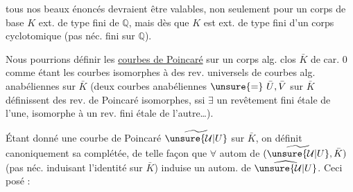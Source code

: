 tous nos beaux énoncés devraient être valables, non seulement pour un corps de base $K$ ext. de type fini de $\mathbb{Q}$, mais dès que $K$ est ext. de type fini d'un corps cyclotomique (pas néc. fini sur $\mathbb{Q}$).

Nous pourrions définir les \uline{courbes de Poincaré} sur un corps alg. clos $\bar K$ de car. $0$ comme étant les courbes isomorphes à des rev. universels de courbes alg. anabéliennes sur $\bar K$ (deux courbes anabéliennes $\unsure{=}\ \bar U,\bar V$ sur $\bar K$ définissent des rev. de Poincaré isomorphes, ssi $\exists$ un revêtement fini étale de l'une, isomorphe à un rev. fini étale de l'autre\ldots).

Étant donné une courbe de Poincaré $\widetilde{\unsure{\mathcal U|U}}$ sur $\bar K$,  on définit canoniquement sa complétée, de telle façon que $\forall$ autom de $(\widetilde{\unsure{\mathcal U|U}},\bar K)$ (pas néc. induisant l'identité sur $\bar K$) induise un autom. de $\widehat{\unsure{\mathcal U|U}}$.
Ceci posé :
